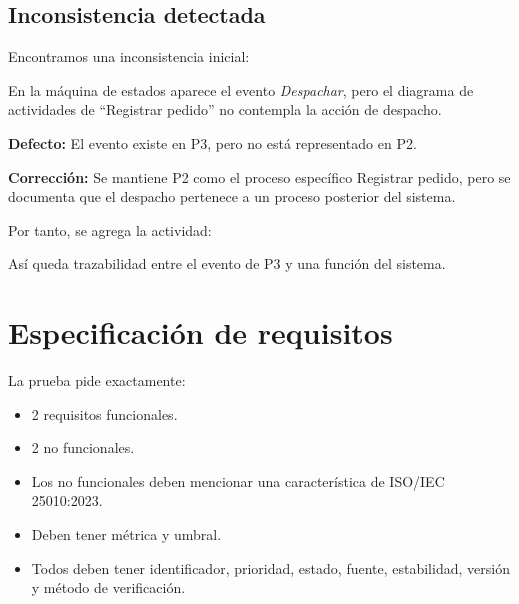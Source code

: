 \documentclass[12pt,a4paper]{article}
\begin{document}
\subsection*{Inconsistencia detectada}

Encontramos una inconsistencia inicial:

En la máquina de estados aparece el evento \emph{Despachar}, pero el diagrama de actividades de ``Registrar pedido'' no contempla la acción de despacho.

\textbf{Defecto:} El evento existe en P3, pero no está representado en P2.

\textbf{Corrección:} Se mantiene P2 como el proceso específico Registrar pedido, pero se documenta que el despacho pertenece a un proceso posterior del sistema.

Por tanto, se agrega la actividad:

\begin{center}
\end{center}

Así queda trazabilidad entre el evento de P3 y una función del sistema.

\section{Especificación de requisitos}

La prueba pide exactamente:

\begin{itemize}[nosep]
    \item 2 requisitos funcionales.
    \item 2 no funcionales.
    \item Los no funcionales deben mencionar una característica de ISO/IEC 25010:2023.
    \item Deben tener métrica y umbral.
    \item Todos deben tener identificador, prioridad, estado, fuente, estabilidad, versión y método de verificación.
\end{itemize}
\end{document}
